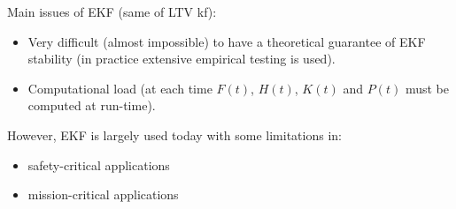 \begin{remark}
    Main issues of EKF (same of LTV \gls{kf}):
    \begin{itemize}
        \item Very difficult (almost impossible) to have a theoretical guarantee of EKF stability (in practice extensive empirical testing is used).
        \item Computational load (at each time $F(t)$, $H(t)$, $K(t)$ and $P(t)$ must be computed at run-time).
    \end{itemize}

    However, EKF is largely used today with some limitations in:
    \begin{itemize}
        \item safety-critical applications
        \item mission-critical applications
    \end{itemize}
\end{remark}

